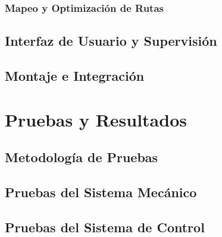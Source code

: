 \documentclass[a4paper,12pt]{report}
\begin{document}
\subsection{Mapeo y Optimización de Rutas} 
%


\section{Interfaz de Usuario y Supervisión}





\section{Montaje e Integración}





\chapter{Pruebas y Resultados}

\section{Metodología de Pruebas}



\section{Pruebas del Sistema Mecánico}





\section{Pruebas del Sistema de Control}



\end{document}
